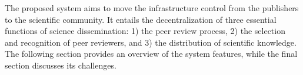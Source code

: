 The proposed system aims to move the infrastructure control from the publishers
to the scientific community. It entails the decentralization of three essential
functions of science dissemination: 1) the peer review process, 2) the selection
and recognition of peer reviewers, and 3) the distribution of scientific
knowledge. The following section provides an overview of the system features,
while the final section discusses its challenges.


